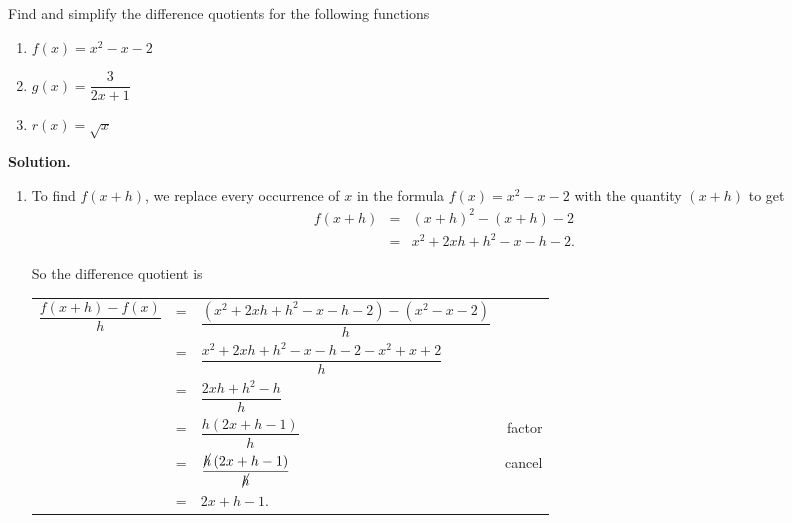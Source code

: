 \documentclass{ximera}
\begin{document}
\begin{example} \label{differencequotientex} Find and simplify the difference quotients for the following functions

\begin{multicols}{3}

\begin{enumerate}

\item  $f(x) = x^2-x-2$ 

\item  $g(x) = \dfrac{3}{2x+1}$

\item  $r(x) = \sqrt{x}$ 

\end{enumerate}

\end{multicols}

{\bf Solution.}
 
\begin{enumerate}

\item To find $f(x+h)$, we replace every occurrence of $x$ in the formula $f(x) = x^2-x-2$ with the quantity $(x+h)$ to get \[ \begin{array}{rclr}  
 
 f(x+h) & = & (x+h)^2 - (x+h) -2 & \\ 
 & = & x^2 + 2xh + h^2 - x - h - 2.
 \end{array} \]

So the difference quotient is

\setlength{\extrarowheight}{12pt}

\begin{longtable}{rclr}  

$\dfrac{f(x+h)-f(x)}{h}$ & = & $\dfrac{\left(x^2+2xh+h^2-x-h-2 \right)-\left(x^{2}-x-2 \right)}{h}$ & \\[8pt] 
& = & $\dfrac{x^2+2xh+h^2-x-h-2-x^2+x+2}{h}$ & \\ [8pt]
& = & $\dfrac{2xh+h^2-h}{h}$ & \\ [8pt]
& = & $\dfrac{h \left(2x+h-1\right)}{h}$ & factor \\ [8pt]
& = & $\dfrac{\cancel{h} \left(2x+h-1\right)}{\cancel{h}}$ & cancel \\ [8pt]
& = & $2x+h-1$. \\

\end{longtable} 


\end{enumerate}
\end{example}
\end{document}
